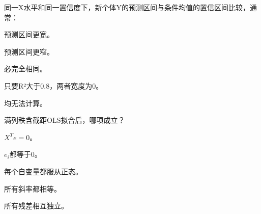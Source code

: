 \par\addvspace{6pt}\noindent\begin{minipage}{\linewidth}


同一X水平和同一置信度下，新个体Y的预测区间与条件均值的置信区间比较，通常：


\begin{choices}

\item 预测区间更宽。

\item 预测区间更窄。

\item 必完全相同。

\item 只要R²大于0.8，两者宽度为0。

\item 均无法计算。

\end{choices}

\end{minipage}\par\vspace{4pt}

\par\addvspace{6pt}\noindent\begin{minipage}{\linewidth}


满列秩含截距OLS拟合后，哪项成立？


\begin{choices}

\item \(X^Te=0\)。

\item \(e_i\)都等于0。

\item 每个自变量都服从正态。

\item 所有斜率都相等。

\item 所有残差相互独立。

\end{choices}

\end{minipage}\par\vspace{4pt}


